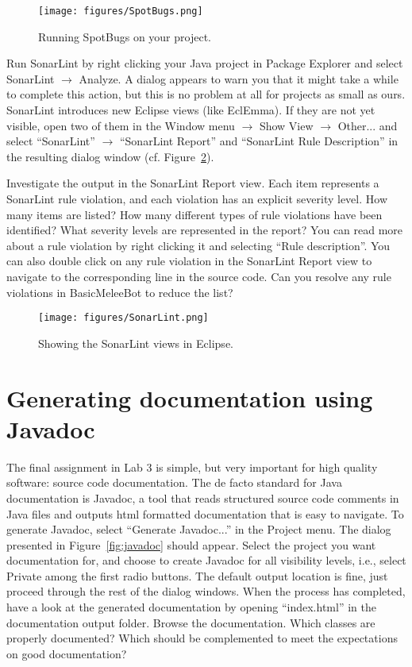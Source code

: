 \documentclass{scrreprt}
\begin{document}
\begin{figure}
\centering
\texttt{[image: figures/SpotBugs.png]}
\caption{Running SpotBugs on your project.}
\label{fig:spotbugs}
\end{figure}

Run SonarLint by right clicking your Java project in Package Explorer and select SonarLint $\rightarrow$ Analyze. A dialog appears to warn you that it might take a while to complete this action, but this is no problem at all for projects as small as ours. SonarLint introduces new Eclipse views (like EclEmma). If they are not yet visible, open two of them in the Window menu $\rightarrow$ Show View $\rightarrow$ Other... and select ``SonarLint'' $\rightarrow$ ``SonarLint Report'' and ``SonarLint Rule Description'' in the resulting dialog window (cf. Figure~\ref{fig:sonarlint}). 

Investigate the output in the SonarLint Report view. Each item represents a SonarLint rule violation, and each violation has an explicit severity level. How many items are listed? How many different types of rule violations have been identified? What severity levels are represented in the report? You can read more about a rule violation by right clicking it and selecting ``Rule description''. You can also double click on any rule violation in the SonarLint Report view to navigate to the corresponding line in the source code. Can you resolve any rule violations in BasicMeleeBot to reduce the list?

\begin{figure}
\centering
\texttt{[image: figures/SonarLint.png]}
\caption{Showing the SonarLint views in Eclipse.}
\label{fig:sonarlint}
\end{figure}

\section{Generating documentation using Javadoc}
The final assignment in Lab 3 is simple, but very important for high quality software: source code documentation. The de facto standard for Java documentation is Javadoc, a tool that reads structured source code comments in Java files and outputs html formatted documentation that is easy to navigate. To generate Javadoc, select ``Generate Javadoc...'' in the Project menu. The dialog presented in Figure~\ref{fig:javadoc} should appear. Select the project you want documentation for, and choose to create Javadoc for all visibility levels, i.e., select Private among the first radio buttons. The default output location is fine, just proceed through the rest of the dialog windows. When the process has completed, have a look at the generated documentation by opening ``index.html'' in the documentation output folder. Browse the documentation. Which classes are properly documented? Which should be complemented to meet the expectations on good documentation?
\end{document}
